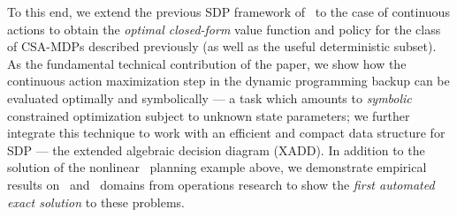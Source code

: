 To this end, we extend the previous SDP framework
of~\cite{sanner_uai11} to the case of continuous actions to obtain the
\emph{optimal closed-form} value function and policy for the
class of CSA-MDPs described previously (as well as the useful
deterministic subset).
As the fundamental technical contribution of the paper, we
show how the continuous action maximization step in the dynamic programming
backup can be evaluated optimally and symbolically --- a task which
amounts to \emph{symbolic} constrained optimization subject to
unknown state parameters; we further integrate this technique to work
with an efficient and compact data structure for SDP --- the extended
algebraic decision diagram (XADD).  
In addition to the solution of the nonlinear \MarsRover\
planning example above, we demonstrate empirical results on
\WaterReservoir\ and \InventoryControl\ domains from operations research
to show the \emph{first automated exact solution} to these problems.
